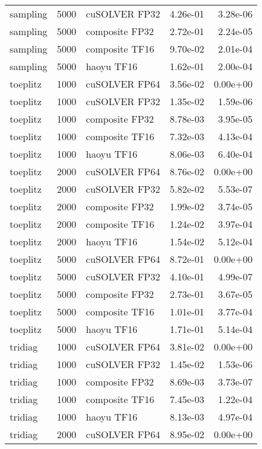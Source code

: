 \begin{table}
\begin{tabular}{lrlrr}
 sampling &  5000 &  cuSOLVER FP32 &  4.26e-01 &        3.28e-06 \\
 sampling &  5000 & composite FP32 &  2.72e-01 &        2.24e-05 \\
 sampling &  5000 & composite TF16 &  9.70e-02 &        2.01e-04 \\
 sampling &  5000 &     haoyu TF16 &  1.62e-01 &        2.00e-04 \\
 toeplitz &  1000 &  cuSOLVER FP64 &  3.56e-02 &        0.00e+00 \\
 toeplitz &  1000 &  cuSOLVER FP32 &  1.35e-02 &        1.59e-06 \\
 toeplitz &  1000 & composite FP32 &  8.78e-03 &        3.95e-05 \\
 toeplitz &  1000 & composite TF16 &  7.32e-03 &        4.13e-04 \\
 toeplitz &  1000 &     haoyu TF16 &  8.06e-03 &        6.40e-04 \\
 toeplitz &  2000 &  cuSOLVER FP64 &  8.76e-02 &        0.00e+00 \\
 toeplitz &  2000 &  cuSOLVER FP32 &  5.82e-02 &        5.53e-07 \\
 toeplitz &  2000 & composite FP32 &  1.99e-02 &        3.74e-05 \\
 toeplitz &  2000 & composite TF16 &  1.24e-02 &        3.97e-04 \\
 toeplitz &  2000 &     haoyu TF16 &  1.54e-02 &        5.12e-04 \\
 toeplitz &  5000 &  cuSOLVER FP64 &  8.72e-01 &        0.00e+00 \\
 toeplitz &  5000 &  cuSOLVER FP32 &  4.10e-01 &        4.99e-07 \\
 toeplitz &  5000 & composite FP32 &  2.73e-01 &        3.67e-05 \\
 toeplitz &  5000 & composite TF16 &  1.01e-01 &        3.77e-04 \\
 toeplitz &  5000 &     haoyu TF16 &  1.71e-01 &        5.14e-04 \\
  tridiag &  1000 &  cuSOLVER FP64 &  3.81e-02 &        0.00e+00 \\
  tridiag &  1000 &  cuSOLVER FP32 &  1.45e-02 &        1.53e-06 \\
  tridiag &  1000 & composite FP32 &  8.69e-03 &        3.73e-07 \\
  tridiag &  1000 & composite TF16 &  7.45e-03 &        1.22e-04 \\
  tridiag &  1000 &     haoyu TF16 &  8.13e-03 &        4.97e-04 \\
  tridiag &  2000 &  cuSOLVER FP64 &  8.95e-02 &        0.00e+00 \\

\end{tabular}
\end{table}
